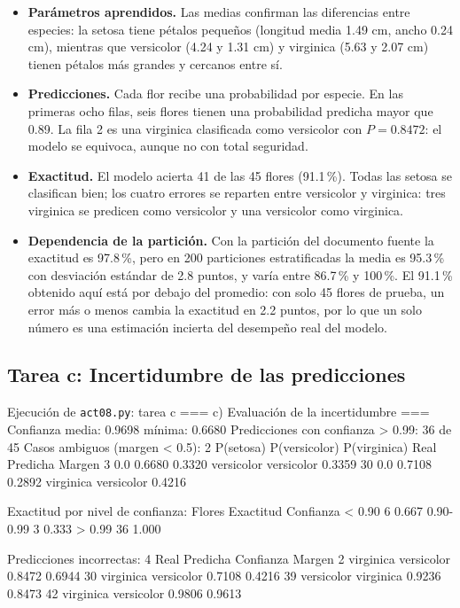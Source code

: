 \documentclass[11pt,letterpaper]{article}
\begin{document}
\begin{itemize}
    \item \textbf{Parámetros aprendidos.} Las medias confirman las diferencias entre especies: la setosa tiene pétalos pequeños (longitud media 1.49 cm, ancho 0.24 cm), mientras que versicolor (4.24 y 1.31 cm) y virginica (5.63 y 2.07 cm) tienen pétalos más grandes y cercanos entre sí.
    \item \textbf{Predicciones.} Cada flor recibe una probabilidad por especie. En las primeras ocho filas, seis flores tienen una probabilidad predicha mayor que 0.89. La fila 2 es una virginica clasificada como versicolor con $P = 0.8472$: el modelo se equivoca, aunque no con total seguridad.
    \item \textbf{Exactitud.} El modelo acierta 41 de las 45 flores (91.1\,\%). Todas las setosa se clasifican bien; los cuatro errores se reparten entre versicolor y virginica: tres virginica se predicen como versicolor y una versicolor como virginica.
    \item \textbf{Dependencia de la partición.} Con la partición del documento fuente la exactitud es 97.8\,\%, pero en 200 particiones estratificadas la media es 95.3\,\% con desviación estándar de 2.8 puntos, y varía entre 86.7\,\% y 100\,\%. El 91.1\,\% obtenido aquí está por debajo del promedio: con solo 45 flores de prueba, un error más o menos cambia la exactitud en 2.2 puntos, por lo que un solo número es una estimación incierta del desempeño real del modelo.
\end{itemize}

\subsection{Tarea c: Incertidumbre de las predicciones}

\begin{consola}[label=out:c]{Ejecución de \texttt{act08.py}: tarea c}
=== c) Evaluación de la incertidumbre ===
Confianza media: 0.9698   mínima: 0.6680
Predicciones con confianza > 0.99: 36 de 45
Casos ambiguos (margen < 0.5): 2
    P(setosa)  P(versicolor)  P(virginica)        Real    Predicha  Margen
3         0.0         0.6680        0.3320  versicolor  versicolor  0.3359
30        0.0         0.7108        0.2892   virginica  versicolor  0.4216

Exactitud por nivel de confianza:
           Flores  Exactitud
Confianza
< 0.90          6      0.667
0.90-0.99       3      0.333
> 0.99         36      1.000

Predicciones incorrectas: 4
          Real    Predicha  Confianza  Margen
2    virginica  versicolor     0.8472  0.6944
30   virginica  versicolor     0.7108  0.4216
39  versicolor   virginica     0.9236  0.8473
42   virginica  versicolor     0.9806  0.9613
\end{consola}
\end{document}
